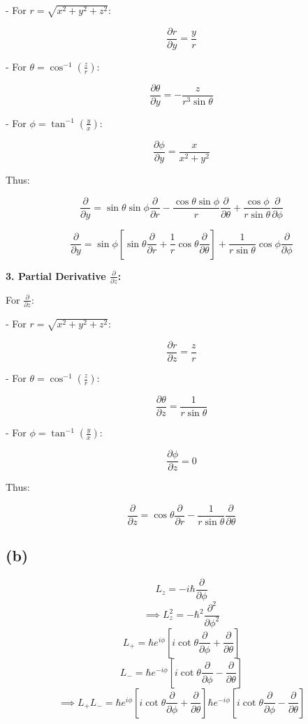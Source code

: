 \documentclass[letter, 10pts]{article}
\newcommand{\hb}{\hbar}
\begin{document}
- For \(r = \sqrt{x^2 + y^2 + z^2}\):

\[
\frac{\partial r}{\partial y} = \frac{y}{r}
\]

- For \(\theta = \cos^{-1} \left( \frac{z}{r} \right)\):

\[
\frac{\partial \theta}{\partial y} = -\frac{z}{r^3 \sin\theta}
\]

- For \(\phi = \tan^{-1} \left( \frac{y}{x} \right)\):

\[
\frac{\partial \phi}{\partial y} = \frac{x}{x^2 + y^2}
\]

Thus:

\[
\frac{\partial}{\partial y} = \sin\theta \sin\phi \frac{\partial}{\partial r} - \frac{\cos\theta\sin \phi }{r} \frac{\partial}{\partial \theta} + \frac{\cos\phi}{r \sin\theta} \frac{\partial}{\partial \phi}
\]

\[\boxed{
\frac{\partial}{\partial y} = 
\sin \phi 
\left[
\sin\theta \frac{\partial}{\partial r} 
+ 
\frac{1}{r}\cos \theta \frac{\partial}{\partial \theta}
\right] 
+ \frac{1}{r \sin\theta}\cos \phi \frac{\partial}{\partial \phi}
}\]

\textbf{3. Partial Derivative \( \frac{\partial}{\partial z} \):}

For \( \frac{\partial}{\partial z} \):

- For \(r = \sqrt{x^2 + y^2 + z^2}\):

\[
\frac{\partial r}{\partial z} = \frac{z}{r}
\]

- For \(\theta = \cos^{-1} \left( \frac{z}{r} \right)\):

\[
\frac{\partial \theta}{\partial z} = \frac{1}{r \sin\theta}
\]

- For \(\phi = \tan^{-1} \left( \frac{y}{x} \right)\):

\[
\frac{\partial \phi}{\partial z} = 0
\]

Thus:

\[\boxed{
\frac{\partial}{\partial z} = \cos\theta \frac{\partial}{\partial r} - \frac{1}{r \sin\theta} \frac{\partial}{\partial \theta}
}\]


\subsection*{(b)} 
\[
L_z = - i \hb \frac{\partial}{\partial \phi}
\] 
\[
\implies L_z^2 = -  \hb^2 \frac{\partial^2}{\partial \phi^2}
\] 
\[
L_+ = 
\hb e^{i \phi} 
\left[
i \cot \theta \frac{\partial }{\partial \phi} + 
\frac{\partial }{\partial \theta} 
\right] 
\] 
\[
L_- = 
\hb e^{- i \phi} 
\left[
i \cot \theta \frac{\partial }{\partial \phi} - 
\frac{\partial }{\partial \theta} 
\right] 
\] 
\[ \implies 
L_+ 
L_- = 
\hb e^{i \phi} 
\left[
i \cot \theta \frac{\partial }{\partial \phi} + 
\frac{\partial }{\partial \theta} 
\right] 
\hb e^{- i \phi} 
\left[
i \cot \theta \frac{\partial }{\partial \phi} - 
\frac{\partial }{\partial \theta} 
\right]  
\]
\end{document}

